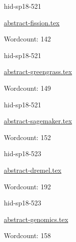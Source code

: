 

\begin{IU}

hid-sp18-521

\href{https://github.com/cloudmesh-community/hid-sp18-521/blob/master//technology/abstract-fission.tex}{abstract-fission.tex}

 

Wordcount: 142

\end{IU}



\begin{IU}

hid-sp18-521

\href{https://github.com/cloudmesh-community/hid-sp18-521/blob/master//technology/abstract-greengrass.tex}{abstract-greengrass.tex}

 

Wordcount: 149

\end{IU}



\begin{IU}

hid-sp18-521

\href{https://github.com/cloudmesh-community/hid-sp18-521/blob/master//technology/abstract-sagemaker.tex}{abstract-sagemaker.tex}

 

Wordcount: 152

\end{IU}



\begin{IU}

hid-sp18-523

\href{https://github.com/cloudmesh-community/hid-sp18-523/blob/master//technology/abstract-dremel.tex}{abstract-dremel.tex}

 

Wordcount: 192

\end{IU}



\begin{IU}

hid-sp18-523

\href{https://github.com/cloudmesh-community/hid-sp18-523/blob/master//technology/abstract-genomics.tex}{abstract-genomics.tex}

 

Wordcount: 158

\end{IU}

